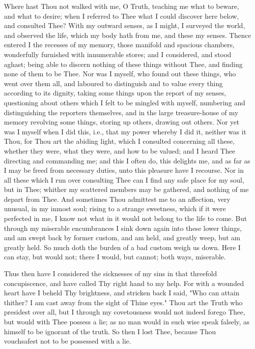 \documentclass[b5paper,openright,12pt,twoside]{book}
\begin{document}
Where hast Thou not walked with me, O Truth, teaching me what to beware,
and what to desire; when I referred to Thee what I could discover
here below, and consulted Thee? With my outward senses, as I might, I
surveyed the world, and observed the life, which my body hath from me,
and these my senses. Thence entered I the recesses of my memory, those
manifold and spacious chambers, wonderfully furnished with innumerable
stores; and I considered, and stood aghast; being able to discern
nothing of these things without Thee, and finding none of them to be
Thee. Nor was I myself, who found out these things, who went over them
all, and laboured to distinguish and to value every thing according
to its dignity, taking some things upon the report of my senses,
questioning about others which I felt to be mingled with myself,
numbering and distinguishing the reporters themselves, and in the large
treasure-house of my memory revolving some things, storing up others,
drawing out others. Nor yet was I myself when I did this, i.e., that my
power whereby I did it, neither was it Thou, for Thou art the abiding
light, which I consulted concerning all these, whether they were,
what they were, and how to be valued; and I heard Thee directing and
commanding me; and this I often do, this delights me, and as far as I
may be freed from necessary duties, unto this pleasure have I recourse.
Nor in all these which I run over consulting Thee can I find any safe
place for my soul, but in Thee; whither my scattered members may
be gathered, and nothing of me depart from Thee. And sometimes Thou
admittest me to an affection, very unusual, in my inmost soul; rising to
a strange sweetness, which if it were perfected in me, I know not what
in it would not belong to the life to come. But through my miserable
encumbrances I sink down again into these lower things, and am swept
back by former custom, and am held, and greatly weep, but am greatly
held. So much doth the burden of a bad custom weigh us down. Here I can
stay, but would not; there I would, but cannot; both ways, miserable.

Thus then have I considered the sicknesses of my sins in that threefold
concupiscence, and have called Thy right hand to my help. For with a
wounded heart have I beheld Thy brightness, and stricken back I said,
"Who can attain thither? I am cast away from the sight of Thine eyes."
Thou art the Truth who presidest over all, but I through my covetousness
would not indeed forego Thee, but would with Thee possess a lie; as no
man would in such wise speak falsely, as himself to be ignorant of the
truth. So then I lost Thee, because Thou vouchsafest not to be possessed
with a lie.
\end{document}
